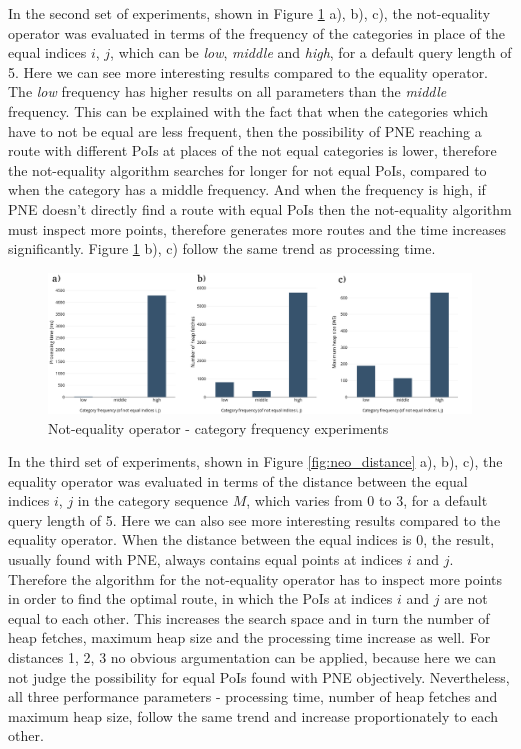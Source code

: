 In the second set of experiments, shown in Figure \ref{fig:neo_frequency} a), b), c), the not-equality operator was evaluated in terms of the frequency of the categories in place of the equal indices $i$, $j$, which can be \textit{low}, \textit{middle} and \textit{high}, for a default query length of 5.  
Here we can see more interesting results compared to the equality operator. The \textit{low} frequency has higher results on all parameters than the \textit{middle} frequency. This can be explained with the fact that when the categories which have to not be equal are less frequent, then the possibility of PNE reaching a route with different PoIs at places of the not equal categories is lower, therefore the not-equality algorithm searches for longer for not equal PoIs, compared to when the category has a middle frequency. And when the frequency is high, if PNE doesn't directly find a route with equal PoIs then the not-equality algorithm must inspect more points, therefore generates more routes and the time increases significantly. 
Figure \ref{fig:neo_frequency} b), c) follow the same trend as processing time. 

\begin{figure}[H]
	\includegraphics[scale=0.3]{images/neo_frequency.png}
	\centering
	\caption{Not-equality operator - category frequency experiments}
	\label{fig:neo_frequency}
\end{figure}

In the third set of experiments, shown in Figure \ref{fig:neo_distance} a), b), c), the equality operator was evaluated in terms of the  distance between the equal indices $i$, $j$ in the category sequence $M$, which varies from 0 to 3, for a default query length of 5.  
Here we can also see more interesting results compared to the equality operator. When the distance between the equal indices is 0, the result, usually found with PNE, always contains equal points at indices $i$ and $j$. Therefore the algorithm for the not-equality operator has to inspect more points in order to find the optimal route, in which the PoIs at indices $i$ and $j$ are not equal to each other. This increases the search space and in turn the number of heap fetches, maximum heap size and the processing time increase as well. For distances 1, 2, 3 no obvious argumentation can be applied, because here we can not judge the possibility for equal PoIs found with PNE objectively.
Nevertheless, all three performance parameters - processing time, number of heap fetches and maximum heap size, follow the same trend and increase proportionately to each other.

